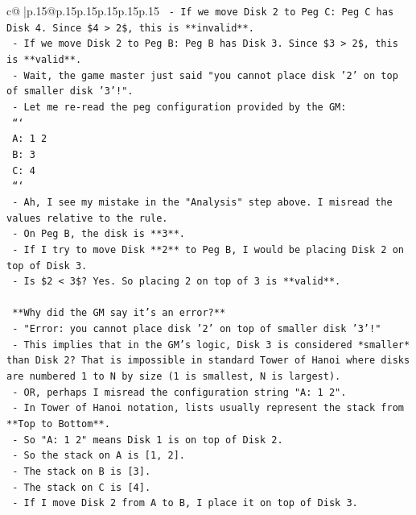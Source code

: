 \documentclass{article}
\begin{document}
{\begin{supertabular}{c@{$\;$}|p{.15\linewidth}@{}p{.15\linewidth}p{.15\linewidth}p{.15\linewidth}p{.15\linewidth}p{.15\linewidth}}
{{{\texttt{    {-} If we move Disk 2 to Peg C: Peg C has Disk 4. Since \$4 > 2\$, this is **invalid**.} \\
\texttt{    {-} If we move Disk 2 to Peg B: Peg B has Disk 3. Since \$3 > 2\$, this is **valid**.} \\
\texttt{    {-} Wait, the game master just said "you cannot place disk '2' on top of smaller disk '3'!".} \\
\texttt{    {-} Let me re{-}read the peg configuration provided by the GM:} \\
\texttt{      ```} \\
\texttt{      A: 1 2 } \\
\texttt{      B: 3 } \\
\texttt{      C: 4 } \\
\texttt{      ```} \\
\texttt{    {-} Ah, I see my mistake in the "Analysis" step above. I misread the values relative to the rule.} \\
\texttt{    {-} On Peg B, the disk is **3**.} \\
\texttt{    {-} If I try to move Disk **2** to Peg B, I would be placing Disk 2 on top of Disk 3.} \\
\texttt{    {-} Is \$2 < 3\$? Yes. So placing 2 on top of 3 is **valid**.} \\
\\ 
\texttt{    **Why did the GM say it's an error?**} \\
\texttt{    {-} "Error: you cannot place disk '2' on top of smaller disk '3'!"} \\
\texttt{    {-} This implies that in the GM's logic, Disk 3 is considered *smaller* than Disk 2? That is impossible in standard Tower of Hanoi where disks are numbered 1 to N by size (1 is smallest, N is largest).} \\
\texttt{    {-} OR, perhaps I misread the configuration string "A: 1 2".} \\
\texttt{      {-} In Tower of Hanoi notation, lists usually represent the stack from **Top to Bottom**.} \\
\texttt{      {-} So "A: 1 2" means Disk 1 is on top of Disk 2.} \\
\texttt{      {-} So the stack on A is {[}1, 2{]}.} \\
\texttt{      {-} The stack on B is {[}3{]}.} \\
\texttt{      {-} The stack on C is {[}4{]}.} \\
\texttt{    {-} If I move Disk 2 from A to B, I place it on top of Disk 3.} \\
}}}
\end{supertabular}}
\end{document}
